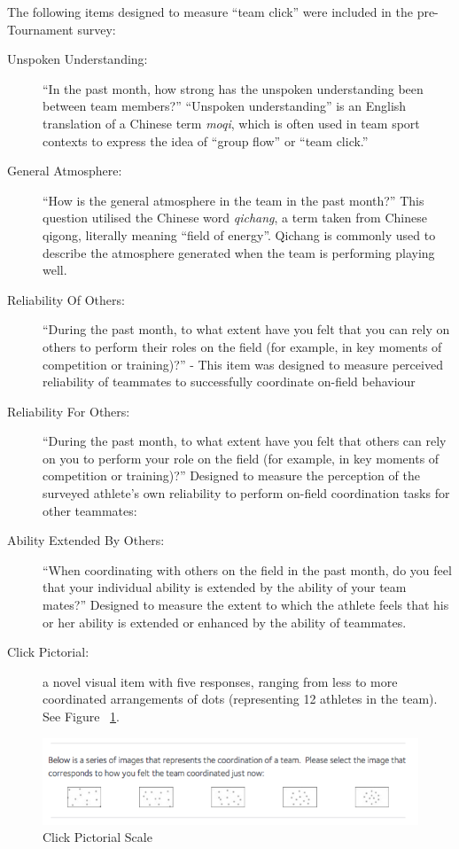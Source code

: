 The following items designed to measure ``team click'' were included in the pre-Tournament survey:
\begin{description}
  \item [Unspoken Understanding:] ``In the past month, how strong has the unspoken understanding been between team members?''  ``Unspoken understanding'' is an English translation of a Chinese term \textit{moqi}, which is often used in team sport contexts to express the idea of  ``group flow'' or ``team click.''
  \item [General Atmosphere:] ``How is the general atmosphere in the team in the past month?'' This question utilised the Chinese word \textit{qichang}, a term taken from Chinese qigong, literally meaning ``field of energy''. Qichang is commonly used to describe the atmosphere generated when the team is performing playing well.
  \item [Reliability Of Others:] ``During the past month, to what extent have you felt that you can rely on others to perform their roles on the field (for example, in key moments of competition or training)?'' - This item was designed to measure perceived reliability of teammates to successfully coordinate  on-field behaviour
  \item [Reliability For Others:] ``During the past month, to what extent have you felt that others can rely on you to perform your role on the field (for example, in key moments of competition or training)?'' Designed to measure the perception of the surveyed athlete's own reliability to perform on-field coordination tasks for other teammates:
  \item[Ability Extended By Others:] ``When coordinating with others on the field in the past month, do you feel that your individual ability is extended by the ability of your team mates?'' Designed to measure the extent to which the athlete feels that his or her ability is extended or enhanced by the ability of teammates.
  \item [Click Pictorial:] a novel visual item with five responses, ranging from less to more coordinated arrangements of dots (representing 12 athletes in the team). See Figure ~\ref{fig:clickPictorial}.
\end{description}

    \begin{figure}[htbp]
      \includegraphics[width = \linewidth]{images/teamClickPictorial.png}
      \caption{Click Pictorial Scale}
      \label{fig:clickPictorial}
    \end{figure}


